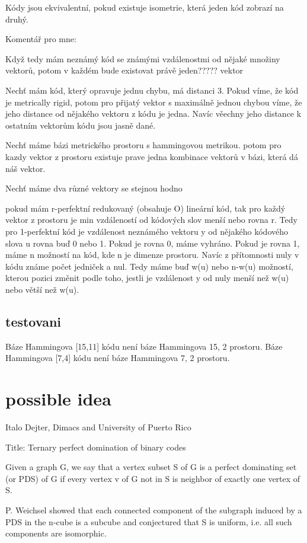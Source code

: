 Kódy jsou ekvivalentní, pokud existuje isometrie, která jeden kód zobrazí na druhý. 


Komentář pro mne:

Když tedy mám neznámý kód se známými vzdálenostmi od nějaké množiny vektorů, potom v každém bude existovat právě jeden????? vektor

Nechť mám kód, který opravuje jednu chybu, má distanci 3. Pokud víme, že kód je metrically rigid, potom pro přijatý vektor s maximálně jednou chybou víme, že jeho distance od nějakého vektoru z kódu je jedna. Navíc věechny jeho distance k ostatním vektorům kódu jsou jasně dané.

Nechť máme bázi metrického prostoru s hammingovou metrikou. potom pro kazdy vektor z prostoru existuje prave jedna kombinace vektorů v bázi, která dá náš vektor. 

Nechť máme dva různé vektory se stejnou hodno

pokud mám r-perfektní redukovaný (obsahuje O) lineární kód, tak pro každý vektor z prostoru je min vzdáleností od kódových slov menší nebo rovna r. Tedy pro 1-perfektní kód je vzdálenost neznámého vektoru y od nějakého kódového slova u rovna buď 0 nebo 1. Pokud je rovna 0, máme vyhráno. Pokud je rovna 1, máme n možností na kód, kde n je dimenze prostoru. Navíc z přítomnosti nuly v kódu známe počet jedniček a nul. Tedy máme buď w(u) nebo n-w(u) možností, kterou pozici změnit podle toho, jestli je vzdálenost y od nuly menší než w(u) nebo větší než w(u). 

\subsection{testovani}
Báze Hammingova [15,11] kódu není báze Hammingova 15, 2 prostoru.
Báze Hammingova [7,4] kódu není báze Hammingova 7, 2 prostoru.


\section{possible idea}
Italo Dejter, Dimacs and University of Puerto Rico

Title: Ternary perfect domination of binary codes

Given a graph G, we say that a vertex subset S of G is a perfect dominating set (or PDS) of G if every vertex v of G not in S is neighbor of exactly one vertex of S.

P. Weichsel showed that each connected component of the subgraph induced by a PDS in the n-cube is a subcube and conjectured that S is uniform, i.e. all such components are isomorphic.

